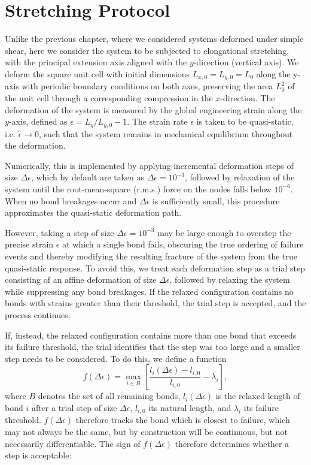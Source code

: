 \documentclass[asymmetricmargins]{library/duthesis}%
\begin{document}
\section{Stretching Protocol} \label{sec:NetworkQuasistatic}
Unlike the previous chapter, where we considered systems deformed under simple shear, here we consider the system to be subjected to elongational stretching, with the principal extension axis aligned with the $y$-direction (vertical axis). We deform the square unit cell with initial dimensions $L_{x,0} = L_{y,0}=L_0$ along the y-axis with periodic boundary conditions on both axes, preserving the area $L_0^2$ of the unit cell through a corresponding compression in the $x$-direction. The deformation of the system is measured by the global engineering strain along the $y$-axis, defined as $\epsilon = L_{y}/L_{y,0} - 1$. The strain rate $\dot{\epsilon}$ is taken to be quasi-static, i.e. $\dot{\epsilon} \to 0$, such that the system remains in mechanical equilibrium throughout the deformation.

Numerically, this is implemented by applying incremental deformation steps of size $\Delta \epsilon$, which by default are taken as $\Delta \epsilon = 10^{-3}$, followed by relaxation of the system until the root-mean-square (r.m.s.) force on the nodes falls below $10^{-6}$. When no bond breakages occur and $\Delta \epsilon$ is sufficiently small, this procedure approximates the quasi-static deformation path.

However, taking a step of size $\Delta\epsilon=10^{-3}$ may be large enough to overstep the precise strain $\epsilon$ at which a single bond fails, obscuring the true ordering of failure events and thereby modifying the resulting fracture of the system from the true quasi-static response. To avoid this, we treat each deformation step as a trial step consisting of an affine deformation of size $\Delta\epsilon$, followed by relaxing the system while suppressing any bond breakages. If the relaxed configuration contains no bonds with strains greater than their threshold, the trial step is accepted, and the process continues.

If, instead, the relaxed configuration contains more than one bond that exceeds its failure threshold, the trial identifies that the step was too large and a smaller step needs to be considered. To do this, we define a function
\begin{equation*}
    f(\Delta\epsilon) = \max_{i\in B} \left[ \frac{l_i(\Delta\epsilon)-l_{i,0}}{l_{i,0}} - \lambda_i \right],
\end{equation*}
where $B$ denotes the set of all remaining bonds, $l_i(\Delta\epsilon)$ is the relaxed length of bond $i$ after a trial step of size $\Delta\epsilon$, $l_{i,0}$ its natural length, and $\lambda_i$ its failure threshold. $f(\Delta\epsilon)$ therefore tracks the bond which is closest to failure, which may not always be the same, but by construction will be continuous, but not necessarily differentiable. The sign of $f(\Delta\epsilon)$ therefore determines whether a step is acceptable:
\end{document}
